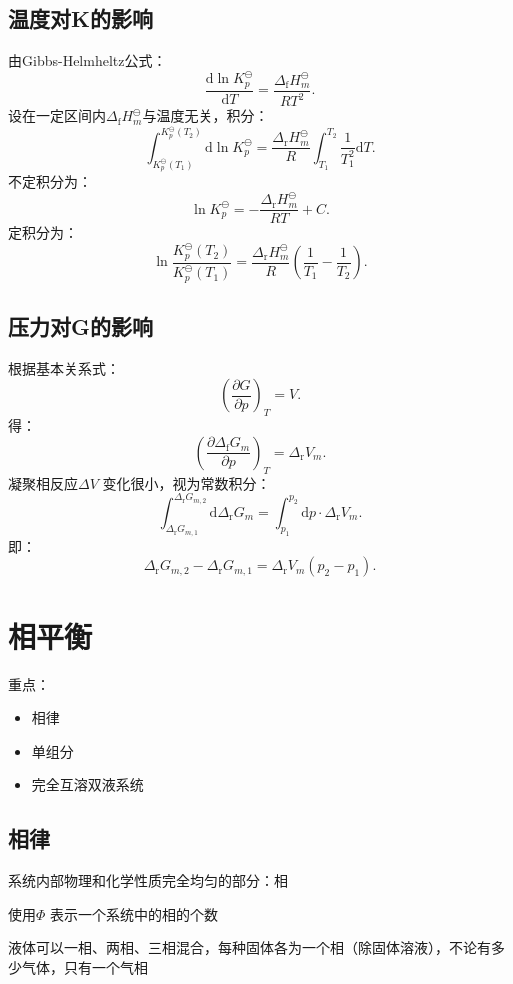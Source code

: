 \subsection{温度对K的影响}%
\label{sub:温度对K的影响}
由Gibbs-Helmheltz公式：
\[
    \frac{\mathrm{d}\ln K_{p}^\ominus}{\mathrm{d}T} = \frac{\Delta_\text{f}H_{m}^\ominus }{RT^2 }
.\]
设在一定区间内$\Delta_\text{f}H_{m}^\ominus $与温度无关，积分：\[
    \int_{K_{p}^\ominus\left( T_1 \right)}^{K_{p}^\ominus\left( T_2 \right)}  \mathrm{d}\ln K_{p}^\ominus = \frac{\Delta_\text{r}H_{m}^\ominus }{R}\int_{T_1}^{T_2} \frac{1}{T_1^2 } \mathrm{d}T
.\]
不定积分为：
\[
    \ln K_{p}^\ominus = -\frac{\Delta_\text{r}H_{m}^\ominus }{RT}+C
.\]
定积分为：
\[\boxed{
    \ln \frac{K_{p}^\ominus\left( T_2 \right)}{K_{p}^\ominus\left( T_1 \right)} = \frac{\Delta_\text{r}H_{m}^\ominus }{R} \left( \frac{1}{T_1}-\frac{1}{T_2} \right)
.}\]
\subsection{压力对G的影响}%
\label{sub:压力对G的影响}
根据基本关系式：\[
    \left(\frac{\partial G}{\partial p}\right)_{T} = V
.\]
得：\[
    \left(\frac{\partial \Delta_\text{f}G_{m}}{\partial p}\right)_{T} = \Delta_\text{r}V_{m}
.\]
凝聚相反应$\Delta V$ 变化很小，视为常数积分：\[
    \int_{\Delta_\text{r}G_{m,1} }^{\Delta_\text{r}G_{m,2} }  \mathrm{d}\Delta_\text{r}G_{m} = \int_{p_1}^{p_2}  \mathrm{d}p \cdot \Delta_\text{r}V_{m}
.\]
即：
\[\boxed{
    \Delta_\text{r}G_{m,2} - \Delta_\text{r}G_{m,1} = \Delta_\text{r}V_{m}\left( p_2-p_1 \right) 
.}\]
\section{相平衡}%
\label{sec:相平衡}
重点：
\begin{itemize}
    \item 相律
    \item 单组分
    \item 完全互溶双液系统
\end{itemize}
\subsection{相律}%
\label{sub:相律}
\begin{defi}
    系统内部物理和化学性质完全均匀的部分：相
\end{defi}
使用$\Phi$ 表示一个系统中的相的个数
\begin{notation}
    液体可以一相、两相、三相混合，每种固体各为一个相（除固体溶液），不论有多少气体，只有一个气相
\end{notation}
